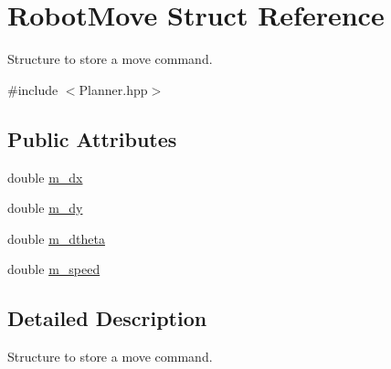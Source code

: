 \hypertarget{structRobotMove}{\section{Robot\-Move Struct Reference}
\label{structRobotMove}
}


Structure to store a move command.  




{\ttfamily \#include $<$Planner.\-hpp$>$}

\subsection*{Public Attributes}
\begin{DoxyCompactItemize}
\item 
double \hyperlink{structRobotMove_aeb93adca1b150538c56a548fb3a060f7}{m\-\_\-dx}
\item 
double \hyperlink{structRobotMove_a8da71ddc10ffe34d3cc0f9d0cb26e33c}{m\-\_\-dy}
\item 
double \hyperlink{structRobotMove_a667d60a557ec5177f77cd0bcf98ba84b}{m\-\_\-dtheta}
\item 
double \hyperlink{structRobotMove_a9b6595c240cc17c54b4436c592c5c6b9}{m\-\_\-speed}
\end{DoxyCompactItemize}


\subsection{Detailed Description}
Structure to store a move command. 

